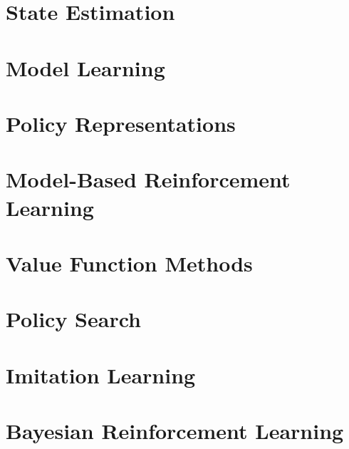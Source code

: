 	\section{State Estimation} %

	\section{Model Learning} %

	\section{Policy Representations} %

	\section{Model-Based Reinforcement Learning} %

	\section{Value Function Methods} %

	\section{Policy Search} %

	\section{Imitation Learning} %

	\section{Bayesian Reinforcement Learning} %
